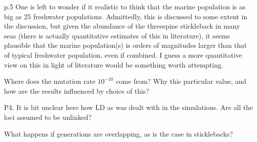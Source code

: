 \begin{point}{p.5}
One is left to wonder if it realistic to think that the marine population is as big as 25 freshwater populations. Admittedly, this is discussed to some extent in the discussion, but given the abundance of the threespine stickleback in many seas (there is actually quantitative estimates of this in literature), it seems plausible that the marine population(s) is orders of magnitudes larger than that of typical freshwater population, even if combined. I guess a more quantitative view on this in light of literature would be something worth attempting.
\end{point}


\begin{point}{\revref}
    Where does the mutation rate $10^{-10}$ come from? Why this particular value, and how are the results influenced by choice of this?
\end{point}


\begin{point}{}
P4. It is bit unclear here how LD as was dealt with in the simulations. Are all the loci assumed to be unlinked?
\end{point}


\begin{point}{\revref}
What happens if generations are overlapping, as is the case in sticklebacks?
\end{point}

